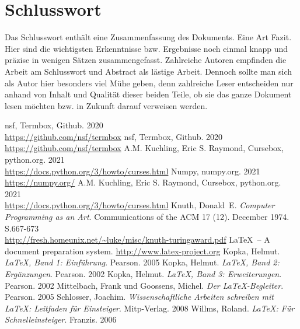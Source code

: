 \documentclass{llncs}
\begin{document}
\section{Schlusswort}

Das Schlusswort enthält eine Zusammenfassung des Dokuments. Eine Art Fazit. Hier sind die wichtigsten Erkenntnisse bzw. Ergebnisse noch einmal knapp und präzise in wenigen Sätzen zusammengefasst. Zahlreiche Autoren empfinden die Arbeit am Schlusswort und Abstract als lästige Arbeit. Dennoch sollte man sich als Autor hier besonders viel Mühe geben, denn zahlreiche Leser entscheiden nur anhand von Inhalt und Qualität dieser beiden Teile, ob sie das ganze Dokument lesen möchten bzw. in Zukunft darauf verweisen werden.



\begin{thebibliography}{5}
\glqq nsf\grqq{}, Termbox, Github. 2020\\
\url{https://github.com/nsf/termbox}
\glqq nsf\grqq{}, Termbox, Github. 2020\\
\url{https://github.com/nsf/termbox}
A.M. Kuchling, Eric S. Raymond, Cursebox, python.org. 2021\\
\url{https://docs.python.org/3/howto/curses.html}
Numpy, numpy.org. 2021\\
\url{https://numpy.org/}
A.M. Kuchling, Eric S. Raymond, Cursebox, python.org. 2021\\
\url{https://docs.python.org/3/howto/curses.html}
Knuth, Donald~E. \textsl{Computer Programming as an Art}. Communications of the ACM 17 (12). December 1974. S.667-673\\
\url{http://fresh.homeunix.net/~luke/misc/knuth-turingaward.pdf}
\LaTeX\ -- A document preparation system.
\url{http://www.latex-project.org}
Kopka, Helmut. \textsl{\LaTeX, Band 1: Einführung}. Pearson. 2005
Kopka, Helmut. \textsl{\LaTeX, Band 2: Ergänzungen}. Pearson. 2002
Kopka, Helmut. \textsl{\LaTeX, Band 3: Erweiterungen}. Pearson. 2002
Mittelbach, Frank und Goossens, Michel. \textsl{Der LaTeX-Begleiter}. Pearson. 2005
Schlosser, Joachim. \textsl{Wissenschaftliche Arbeiten schreiben mit LaTeX: Leitfaden für Einsteiger}. Mitp-Verlag. 2008
Willms, Roland. \textsl{\LaTeX: Für Schnelleinsteiger}. Franzis. 2006
\end{thebibliography}
\end{document}
